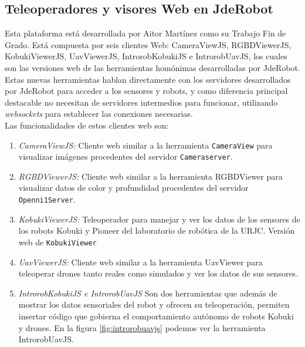 \subsection{Teleoperadores y visores Web en JdeRobot}

Esta plataforma está desarrollada por Aitor Martínez como su Trabajo Fin de Grado. Está compuesta por seis clientes Web: CameraViewJS, RGBDViewerJS, KobukiViewerJS, UavViewerJS, IntrorobKobukiJS e IntrorobUavJS, los cuales son las versiones web de las herramientas homónimas desarrolladas por JdeRobot. Estas nuevas herramientas hablan directamente con los servidores desarrollados por JdeRobot para acceder a los sensores y robots, y como diferencia principal destacable no necesitan de servidores intermedios para funcionar, utilizando \emph{websockets} para establecer las conexiones necesarias.\\

\noindent Las funcionalidades de estos clientes web son: 

\begin{enumerate}

\item \emph{CameraViewJS:} Cliente web similar a la herramienta \texttt{CameraView} para visualizar imágenes procedentes del servidor \texttt{Cameraserver}. 

\item \emph{RGBDViewerJS:} Cliente web similar a la herramienta RGBDViewer para visualizar datos de color y profundidad procedentes del servidor \texttt{Openni1Server}.
  
\item \emph{KobukiViewerJS:} Teleoperador para manejar y ver los datos de los sensores de los robots Kobuki y Pioneer del laboratorio de robótica de la URJC. Versión web de \texttt{KobukiViewer}
  
  
\item \emph{UavViewerJS:} Cliente web similar a la herramienta UavViewer para teleoperar drones tanto reales como simulados y ver los datos de sus sensores.
  
  
\item \emph{IntrorobKobukiJS e IntrorobUavJS} Son dos herramientas que además de mostrar los datos sensoriales del robot y ofrecen su teleoperación, permiten insertar código que gobierna el comportamiento autónomo de robots Kobuki y drones. En la figura \ref{fig:introrobuavjs} podemos ver la herramienta IntrorobUavJS.

\end{enumerate}

